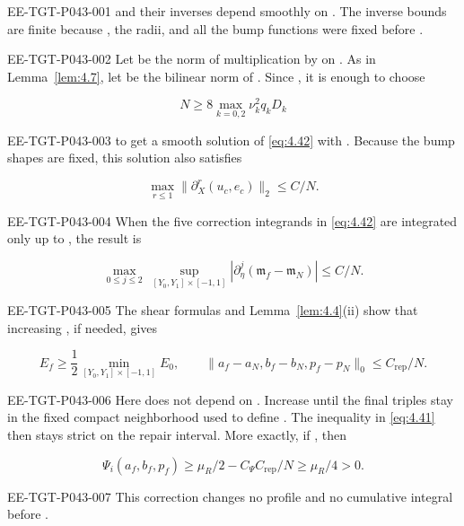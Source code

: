 %
\begin{EESegment}{EE-TGT-P043-001}
and their inverses depend smoothly on . The inverse bounds are finite
because , the radii, and all the bump functions were fixed before
.
\end{EESegment}

\begin{EESegment}{EE-TGT-P043-002}
Let  be the norm of multiplication by
 on
. As in Lemma~\ref{lem:4.7}, let
 be the bilinear norm of
. Since
, it is enough to choose
\end{EESegment}
\[
N\ge 8\max_{k=0,2}\nu_k^2q_kD_k
\]
\begin{EESegment}{EE-TGT-P043-003}
to get a smooth solution of \eqref{eq:4.42} with
. Because the bump shapes are fixed,
this solution also satisfies
\end{EESegment}
\[
\max_{r\le 1}\lVert \partial_X^r(u_c,e_c)\rVert_2\le C/N.
\]
\begin{EESegment}{EE-TGT-P043-004}
When the five correction integrands in \eqref{eq:4.42} are integrated only up to
, the result is
\end{EESegment}
\[
\max_{0\le j\le 2}\ \sup_{[Y_0,Y_1]\times[-1,1]}
\left|\partial_\eta^j(\mathfrak m_f-\mathfrak m_N)\right|\le C/N.
\]
\begin{EESegment}{EE-TGT-P043-005}
The shear formulas and Lemma~\ref{lem:4.4}\textup{(ii)} show that increasing
, if needed, gives
\end{EESegment}
\[
E_f\ge \frac12\min_{[Y_0,Y_1]\times[-1,1]}E_0,
\qquad
\lVert a_f-a_N,b_f-b_N,p_f-p_N\rVert_0
\le C_{\mathrm{rep}}/N.
\]
\begin{EESegment}{EE-TGT-P043-006}
Here  does not depend on
. Increase  until the final triples stay in the
fixed compact neighborhood used to define . The inequality in
\eqref{eq:4.41} then stays strict on the repair interval. More exactly, if
, then
\end{EESegment}
\[
\Psi_i(a_f,b_f,p_f)\ge \mu_R/2-C_\Psi C_{\mathrm{rep}}/N
\ge \mu_R/4>0.
\]
\begin{EESegment}{EE-TGT-P043-007}
This correction changes no profile and no cumulative integral before
.
\end{EESegment}


